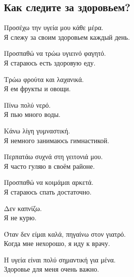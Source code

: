 \documentclass[12pt]{article}
\newcommand{\my}[1]{\textcolor{gray!80!white}{#1}}
\newenvironment{page}{\clearpage\normalsize\null\vfill}{\vfill\null}
\newenvironment{textblock}{\begin{minipage}{\textwidth}}{\end{minipage}\smallskip}
\begin{document}
	\begin{page}
		\subsection{Как следите за здоровьем?}
		\small
		\begin{textblock}
			Προσέχω την υγεία μου κάθε μέρα.\\
			\my{Я слежу за своим здоровьем каждый день.}
			
			Προσπαθώ να τρώω υγιεινό φαγητό.\\
			\my{Я стараюсь есть здоровую еду.}
			
			Τρώω φρούτα και λαχανικά.\\
			\my{Я ем фрукты и овощи.}
			
			Πίνω πολύ νερό.\\
			\my{Я пью много воды.}
			
			Κάνω λίγη γυμναστική.\\
			\my{Я немного занимаюсь гимнастикой.}
			
			Περπατάω συχνά στη γειτονιά μου.\\
			\my{Я часто гуляю в своём районе.}
			
			Προσπαθώ να κοιμάμαι αρκετά.\\
			\my{Я стараюсь спать достаточно.}
			
			Δεν καπνίζω.\\
			\my{Я не курю.}
			
			Όταν δεν είμαι καλά, πηγαίνω στον γιατρό.\\
			\my{Когда мне нехорошо, я иду к врачу.}
			
			Η υγεία είναι πολύ σημαντική για μένα.\\
			\my{Здоровье для меня очень важно.}
		\end{textblock}
	\end{page}
	
\end{document}
